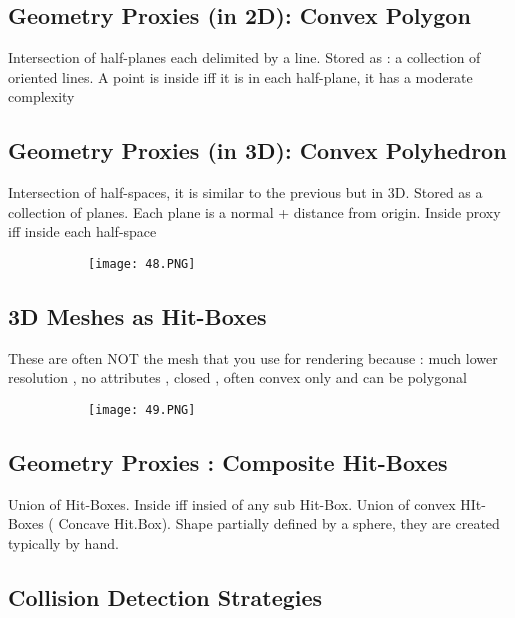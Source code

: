 \documentclass{article}
\begin{document}
\subsection{Geometry Proxies (in 2D): Convex Polygon}
Intersection of half-planes each delimited by a line. Stored as : a collection of oriented lines.
A point is inside iff it is in each half-plane, it has a moderate complexity

\subsection{Geometry Proxies (in 3D): Convex Polyhedron}

Intersection of half-spaces, it is similar to the previous but in 3D. Stored as a collection of planes. Each plane is a normal + distance from origin. Inside proxy iff inside each half-space


\begin{figure}[ht!]
  \centering
  \begin{subfigure}[b]{0.1\linewidth}
    \texttt{[image: 48.PNG]}
  \end{subfigure}
\end{figure}

\subsection{3D Meshes as Hit-Boxes}

These are often NOT the mesh that you use for rendering because : much lower resolution , no attributes , closed , often convex only and can be polygonal

\begin{figure}[ht!]
  \centering
  \begin{subfigure}[b]{0.5\linewidth}
    \texttt{[image: 49.PNG]}
  \end{subfigure}
\end{figure}

\subsection{Geometry Proxies : Composite Hit-Boxes}

Union of Hit-Boxes. Inside iff insied of any sub Hit-Box. Union of convex HIt-Boxes ( Concave Hit.Box). Shape partially defined by a sphere, they are created typically by hand.

\subsection{Collision Detection Strategies}
\end{document}
